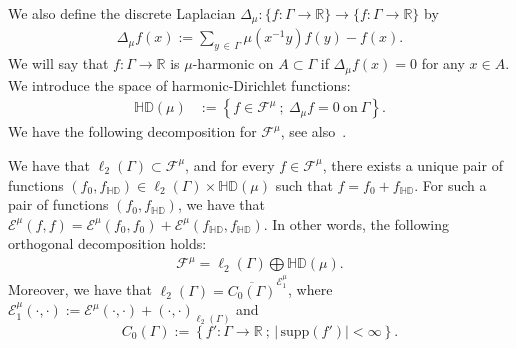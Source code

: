 \documentclass[AHL,Unicode,longabstracts,published]{cedram}
\newcommand{\ce}{\mathcal{E}}
\newcommand{\cf}{\mathcal{F}}
\newcommand{\br}{\mathbb{R}}
\newcommand{\bHD}{\mathbb{HD}}
\newcommand{\supp}{\mathrm{supp}}
\begin{document}
We also define the discrete Laplacian $\Delta_{\mu}:\{f:\Gamma\to\br\}\to
\{f:\Gamma\to\br\}$ by
\begin{align*}
\Delta_{\mu}f(x):=\sum_{y\,\in\,\Gamma}\mu\left(x^{-1}y\right)f(y)-f(x).
\end{align*}
We will say that $f:\Gamma\to\br$ is $\mu$-harmonic on $A\subset\Gamma$ if $\Delta_{\mu}f(x)=0$ for any $x\in A$. We introduce the space of harmonic-Dirichlet functions:
\begin{align*}
\bHD(\mu)&:=\left\{f\in\cf^{\mu}\ ;\ \Delta_{\mu}f=0\ \text{on}\ \Gamma\right\}.
\end{align*}
We have the following decomposition for $\cf^{\mu}$, see also~\cite[Theorem~3.69]{Soa}.

\begin{prop}\label{RD}
We have that $\ell_2(\Gamma)\subset\cf^{\mu}$, and for every $f\in\cf^{\mu}$, there exists a unique pair of functions $(f_0,f_{\bHD})\in\ell_2(\Gamma)\times\bHD(\mu)$ such that $f=f_0+f_{\bHD}$. For such a pair of functions $(f_0,f_{\bHD})$, we have that $\ce^{\mu}(f,f)=\ce^{\mu}(f_0,f_0) +\ce^{\mu}(f_{\bHD},f_{\bHD})$. In other words, the following orthogonal decomposition holds:
\begin{align}\label{royden}
\cf^\mu=\ell_2(\Gamma)\bigoplus\bHD(\mu).
\end{align}
Moreover, we have that $\ell_2(\Gamma)=\overline{C_0(\Gamma)}^{\ce^{\mu}_1}$, where $\ce^{\mu}_1(\cdot,\cdot):=\ce^{\mu}(\cdot,\cdot)+(\cdot,\cdot)_{\ell_2(\Gamma)}$ and
\[
C_0(\Gamma):=\left\{f':\Gamma\to\br\ ;\, |\,\supp(f')|<\infty\right\}.
\]
\end{prop}
\end{document}
